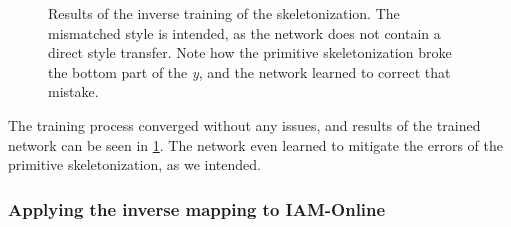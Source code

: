 \begin{figure}
  \centering
  \caption[Results of the inverse training of the skeletonization]{Results of the inverse training of the skeletonization. The mismatched style is intended, as the network does not contain a direct style transfer. Note how the primitive skeletonization broke the bottom part of the \emph{y}, and the network learned to correct that mistake.}
  \label{fig:invSkeletonResult}
\end{figure}

The training process converged without any issues, and results of the trained network can be seen in \cref{fig:invSkeletonResult}. The network even learned to mitigate the errors of the primitive skeletonization, as we intended.

\subsubsection{Applying the inverse mapping to IAM-Online}

